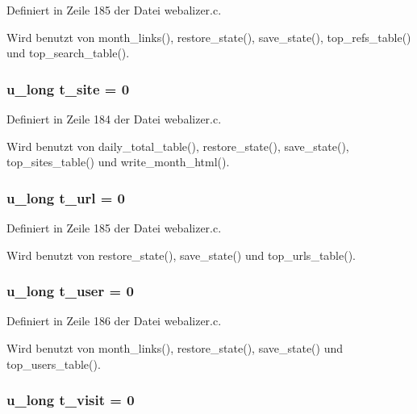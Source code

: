 Definiert in Zeile 185 der Datei webalizer.c.

Wird benutzt von month\_\-links(), restore\_\-state(), save\_\-state(), top\_\-refs\_\-table() und top\_\-search\_\-table().
\subsubsection{\setlength{\rightskip}{0pt plus 5cm}u\_\-long {\bf t\_\-site} = 0}\label{webalizer_8c_e37f859c6ceb40434ecd96c6ba5d0565}




Definiert in Zeile 184 der Datei webalizer.c.

Wird benutzt von daily\_\-total\_\-table(), restore\_\-state(), save\_\-state(), top\_\-sites\_\-table() und write\_\-month\_\-html().
\subsubsection{\setlength{\rightskip}{0pt plus 5cm}u\_\-long {\bf t\_\-url} = 0}\label{webalizer_8c_593eb26715b7f629074c61861d8dd8b3}




Definiert in Zeile 185 der Datei webalizer.c.

Wird benutzt von restore\_\-state(), save\_\-state() und top\_\-urls\_\-table().
\subsubsection{\setlength{\rightskip}{0pt plus 5cm}u\_\-long {\bf t\_\-user} = 0}\label{webalizer_8c_196ee522ca1e09cef5b8962a7c63e4e2}




Definiert in Zeile 186 der Datei webalizer.c.

Wird benutzt von month\_\-links(), restore\_\-state(), save\_\-state() und top\_\-users\_\-table().
\subsubsection{\setlength{\rightskip}{0pt plus 5cm}u\_\-long {\bf t\_\-visit} = 0}\label{webalizer_8c_241257c2fb7477a7dc9191c01e8a155a}




